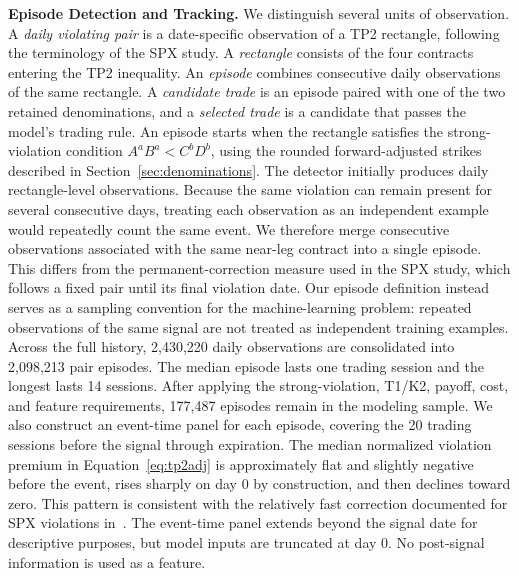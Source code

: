 \documentclass[sigconf,review,anonymous]{acmart}
\begin{document}
\smallskip\noindent\textbf{Episode Detection and Tracking.}
\label{sec:episode-tracking}
We distinguish several units of observation. A \emph{daily violating pair} is a date-specific observation of a TP2 rectangle, following the terminology of the SPX study. A \emph{rectangle} consists of the four contracts entering the TP2 inequality. An \emph{episode} combines consecutive daily observations of the same rectangle. A \emph{candidate trade} is an episode paired with one of the two retained denominations, and a \emph{selected trade} is a candidate that passes the model's trading rule.
An episode starts when the rectangle satisfies the strong-violation condition $A^aB^a<C^bD^b$, using the rounded forward-adjusted strikes described in Section~\ref{sec:denominations}. The detector initially produces daily rectangle-level observations. Because the same violation can remain present for several consecutive days, treating each observation as an independent example would repeatedly count the same event. We therefore merge consecutive observations associated with the same near-leg contract into a single episode.
This differs from the permanent-correction measure used in the SPX study, which follows a fixed pair until its final violation date. Our episode definition instead serves as a sampling convention for the machine-learning problem: repeated observations of the same signal are not treated as independent training examples. Across the full history, 2{,}430{,}220 daily observations are consolidated into 2{,}098{,}213 pair episodes. The median episode lasts one trading session and the longest lasts 14 sessions. After applying the strong-violation, T1/K2, payoff, cost, and feature requirements, 177{,}487 episodes remain in the modeling sample.
We also construct an event-time panel for each episode, covering the 20 trading sessions before the signal through expiration. The median normalized violation premium in Equation~\eqref{eq:tp2adj} is approximately flat and slightly negative before the event, rises sharply on day 0 by construction, and then declines toward zero. This pattern is consistent with the relatively fast correction documented for SPX violations in~\cite{glasserman2025tp2}. The event-time panel extends beyond the signal date for descriptive purposes, but model inputs are truncated at day 0. No post-signal information is used as a feature.
\end{document}
